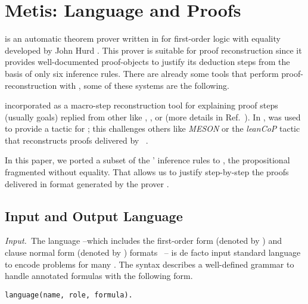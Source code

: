 \documentclass[../main.tex]{subfiles}
\begin{document}

\section{Metis: Language and Proofs}
\label{sec:metis-language-and-proofs}

\Metis is an automatic theorem prover written in 
for first-order logic with equality developed by John Hurd
\cite{hurd2003first}. This prover is suitable for proof
reconstruction since it provides well-documented proof-objects to
justify its deduction steps from the basis of only six inference
rules. There are already some tools that perform proof-reconstruction
with \Metis, some of these systems are the following.

 incorporated \Metis as a macro-step
reconstruction tool for explaining proof steps (usually \CNF goals)
replied from other \ATPs like , , or
 (more details in Ref.~\cite{paulson2007source}).
In \cite{Farber2015}, \Metis was used to provide a tactic for
; this challenges others like \emph{MESON}
or the \emph{leanCoP} tactic that reconstructs proofs
delivered by ~\cite{Farber2016}.

In this paper, we ported a subset of the \Metis' inference rules to
\Agda, the propositional fragmented without equality.
That allows us to justify step-by-step the proofs delivered in
\TSTP format generated by the prover \Metis.


\subsection{Input and Output Language}
\label{ssec:input-and-output-language}

\textit{Input.}~The \TPTP language --which includes the first-order
form (denoted by ) and clause normal form (denoted by
) formats~\cite{sutcliffe2009} -- is de facto input
standard language to encode problems for many \ATPs. The \TPTP
syntax describes a well-defined grammar to handle annotated formulas
with the following form.

\begin{verbatim}
language(name, role, formula).
\end{verbatim}
\end{document}
